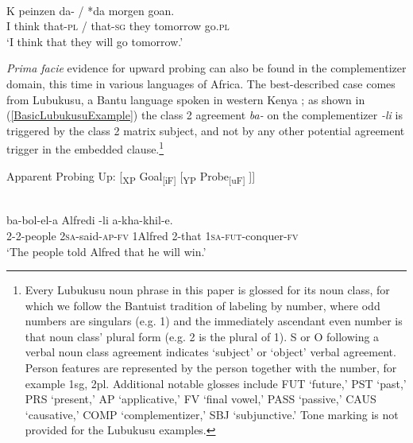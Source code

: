 \documentclass[output=paper
,modfonts
,nonflat
]{langsci/langscibook}
\begin{document}
\ea \label{WestFlemFirstExample}
 \\
\gll K peinzen 	da- /   *da\circled{-\O}        	 	morgen 	goan. \\
I think that-\textsc{pl} / that-\textsc{sg} they tomorrow go.\textsc{pl} \\
\glt `I think that they will go tomorrow.' 	
\z						

\textit{Prima facie} evidence for upward probing can also be found in the complementizer domain, this time in various languages of Africa. The best-described case comes from Lubukusu, a Bantu language spoken in western Kenya \citep{Diercks:2010,Diercks:2013,Wasike:2007}; as shown in (\ref{BasicLubukusuExample}) the class 2 agreement \textit{ba-} on the complementizer \textit{-li} is triggered by the class 2 matrix subject, and not by any other potential agreement trigger in the embedded clause.\footnote{Every Lubukusu noun phrase in this paper is glossed for its noun class, for which we follow the Bantuist tradition of labeling by number, where odd numbers are singulars (e.g. 1) and the immediately ascendant even number is that noun class’ plural form (e.g. 2 is the plural of 1).  S or O following a verbal noun class agreement indicates ‘subject’ or ‘object’ verbal agreement.  Person features are represented by the person together with the number, for example 1sg, 2pl. Additional notable glosses include FUT ‘future,’ PST ‘past,’ PRS ‘present,’ AP ‘applicative,’ FV ‘final vowel,’ PASS ‘passive,’ CAUS ‘causative,’ COMP ‘complementizer,’ SBJ ‘subjunctive.’  Tone marking is not provided for the Lubukusu examples.} 

\ea \label{ProbingUpSchematic}
Apparent Probing Up: [\textsubscript{XP} Goal\textsubscript{[iF]} [\textsubscript{YP} Probe\textsubscript{[uF]} ]]
\z

\ea \label{BasicLubukusuExample}
\\
\gll {}	ba-bol-el-a	Alfredi	-li	a-kha-khil-e.\\
	2-2-people 	2\textsc{sa}-said-\textsc{ap}-\textsc{fv}	1Alfred	2-that	1\textsc{sa}-\textsc{fut}-conquer-\textsc{fv} \\
\glt `The people told Alfred that he will win.'	
\z
\end{document}
